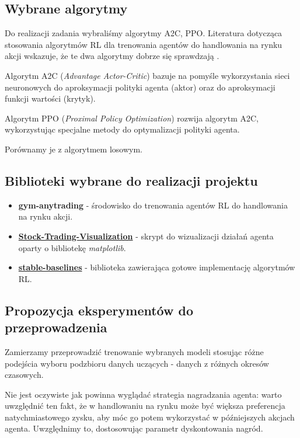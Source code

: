 \documentclass[12pt,a4paper]{article}
\begin{document}
\subsection{Wybrane algorytmy}

Do realizacji zadania wybraliśmy algorytmy A2C, PPO. Literatura dotycząca
stosowania algorytmów RL dla trenowania agentów do handlowania na rynku
akcji wskazuje, że te dwa algorytmy dobrze się sprawdzają
\cite{ensemble_strat}.

Algorytm A2C (\emph{Advantage Actor-Critic}) bazuje na pomyśle
wykorzystania sieci neuronowych do aproksymacji polityki agenta (aktor)
oraz do aproksymacji funkcji wartości (krytyk).

Algorytm PPO (\emph{Proximal Policy Optimization}) rozwija algorytm A2C,
wykorzystując specjalne metody do optymalizacji polityki agenta.

\medskip

Porównamy je z algorytmem losowym.

\subsection{Biblioteki wybrane do realizacji projektu}

\begin{itemize}
  \item \textbf{gym-anytrading} - środowisko do trenowania agentów RL do
        handlowania na rynku akcji.
  \item \textbf{\href{https://github.com/notadamking/Stock-Trading-Visualization}{Stock-Trading-Visualization}} -
        skrypt do wizualizacji działań agenta oparty o bibliotekę \emph{matplotlib}.
  \item \textbf{\href{https://github.com/DLR-RM/stable-baselines3}{stable-baselines}} -
        biblioteka zawierająca gotowe implementację algorytmów RL.
\end{itemize}

\subsection{Propozycja eksperymentów do przeprowadzenia}\label{exps_proposal}

Zamierzamy przeprowadzić trenowanie wybranych modeli stosując różne
podejścia wyboru podzbioru danych uczących - danych z różnych okresów
czasowych.

Nie jest oczywiste jak powinna wyglądać strategia nagradzania agenta:
warto uwzględnić ten fakt, że w handlowaniu na rynku może być większa
preferencja natychmiastowego zysku, aby móc go potem wykorzystać w
późniejszych akcjach agenta. Uwzględnimy to, dostosowując parametr
dyskontowania nagród.
\end{document}
